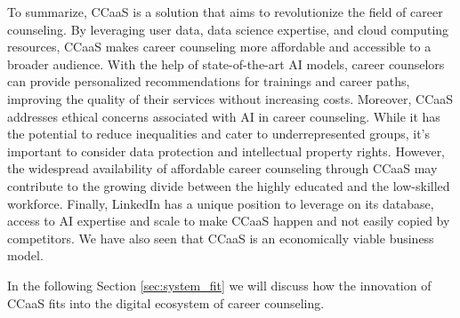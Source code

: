 To summarize, CCaaS is a solution that aims to revolutionize the field of career counseling. By leveraging
user data, data science expertise, and cloud computing resources, CCaaS makes career counseling more affordable
and accessible to a broader audience. With the help of state-of-the-art AI models, career counselors can provide
personalized recommendations for trainings and career paths, improving the quality of their services without
increasing costs. Moreover, CCaaS addresses ethical concerns associated with AI in career counseling. While it
has the potential to reduce inequalities and cater to underrepresented groups, it's important to consider data
protection and intellectual property rights. However, the widespread availability of affordable career counseling
through CCaaS may contribute to the growing divide between the highly educated and the low-skilled workforce.
Finally, LinkedIn has a unique position to leverage on its database, access to AI expertise and scale to 
make CCaaS happen and not easily copied by competitors. We have also seen that CCaaS is an economically viable
business model.
\newline

\noindent In the following Section \ref{sec:system_fit} we will discuss how the innovation of CCaaS fits into 
the digital ecosystem of career counseling.